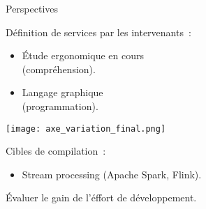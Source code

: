 \begin{frame}{Perspectives}
\begin{minipage}{.5\linewidth}
Définition de services par les intervenants~:\\
\begin{itemize}
\item Étude ergonomique en cours \\(compréhension).
\item Langage graphique \\(programmation).
\end{itemize}
\end{minipage}
\hfill
\begin{minipage}{.45\linewidth}
\vspace*{3.11mm}
    \texttt{[image: axe\_variation\_final.png]}
\end{minipage}
\vfill
Cibles de compilation~:\\
\begin{itemize}
\item Stream processing (Apache Spark, Flink).
\end{itemize}
Évaluer le gain de l'éffort de développement.
\end{frame}